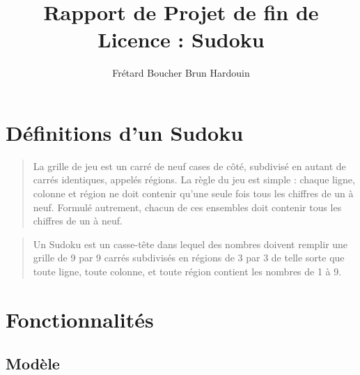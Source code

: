 \documentclass[a4paper,10pt]{report}
\title{Rapport de Projet de fin de Licence : Sudoku}
\author{Frétard Boucher Brun Hardouin}
\begin{document}
\maketitle

\chapter*{Définitions d'un Sudoku}

\begin{quote}
 La grille de jeu est un carré de neuf cases de côté,
 subdivisé en autant de carrés identiques, appelés régions.
 La règle du jeu est simple : chaque ligne, colonne et région ne doit
 contenir qu'une seule fois tous les chiffres de un à neuf.
 Formulé autrement, chacun de ces ensembles doit contenir tous
 les chiffres de un à neuf.

\end{quote}

\begin{quote}
 Un Sudoku est un casse-tête dans lequel des nombres doivent remplir une grille
 de 9 par 9 carrés subdivisés en régions de 3 par 3 de telle sorte que toute ligne,
 toute colonne, et toute région contient les nombres de 1 à 9.
 
\end{quote}

\chapter*{Fonctionnalités}

% 


\section*{Modèle}
\end{document}
